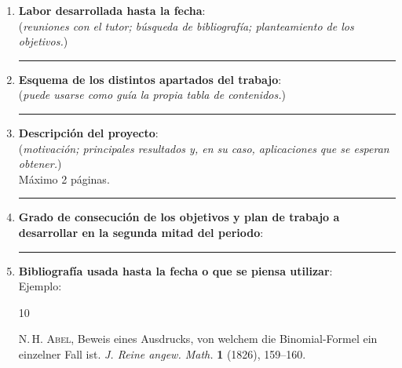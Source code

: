 \documentclass[a4paper,oneside,11pt,leqno]{article}
\begin{document}
\begin{enumerate}

\item {\bf Labor desarrollada hasta la fecha}: \\
{\small (\textit{reuniones con el tutor; b\'usqueda de bibliograf\'ia; planteamiento de los objetivos.})}

\vskip 95pt 
\hrule

\item {\bf Esquema de los distintos apartados del trabajo}: \\
{\small (\textit{puede usarse como gu\'ia la propia tabla de contenidos.})}

\vskip 95pt 
\hrule
\item {\bf Descripci\'on del proyecto}: \\
{\small (\textit{motivaci\'on; principales resultados y, en su caso, aplicaciones que se esperan obtener.})} \\
M\'aximo 2 p\'aginas.
\vskip 95pt  
\hrule
\item {\bf Grado de consecuci\'on de los objetivos y plan de trabajo a desarrollar en la segunda mitad del periodo}: 
\vskip 95pt 
\hrule
\item {\bf Bibliograf\'ia usada hasta la fecha o que se piensa utilizar}: \\
Ejemplo:

\begin{thebibliography}{10}

    \textsc{N.\,H. Abel}, 
    Beweis eines Ausdrucks, von welchem die Binomial-Formel ein einzelner Fall ist. 
    \textit{J. Reine angew. Math.} {\bf1} (1826), 159--160.

\end{thebibliography}


\end{enumerate}
\end{document}
